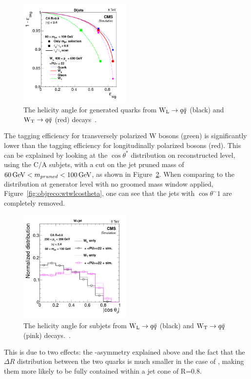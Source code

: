 \begin{figure}[h] 
    \centering 
    \includegraphics[width=0.5\textwidth]{figures/event_reconstruction/substructure_pas_roc3b.png}
     \caption{The helicity angle for generated quarks from $\mathrm{W}_{\mathrm{L}}\rightarrow q\bar{q}$ (black) and $\mathrm{W}_{\mathrm{T}}\rightarrow q\bar{q}$ (red) decays~\cite{Khachatryan:2014vla}.}
     \label{fig:objreco:wtwleff}
 \end{figure}

The tagging efficiency for transversely polarized W bosons (green) is significantly lower than the tagging efficiency for longitudinally polarized bosons (red). This can be explained by looking at the  $\cos \theta^*$ distribution on reconstructed level, using the C/A subjets, with a cut on the jet pruned mass of $60 \,\text{Ge\hspace{-.08em}V} < m_{pruned} < 100 \,\text{Ge\hspace{-.08em}V}$, as shown in Figure~\ref{fig:objreco:wtwlcostheta_reco}. When comparing to the distribution at generator level with no groomed mass window applied, Figure~\ref{fig:objreco:wtwlcostheta}, one can see that the \PWT jets with $\cos \theta^ \sim 1$ are completely removed.
\begin{figure}[h] 
    \centering 
    \includegraphics[width=0.5\textwidth]{figures/event_reconstruction/s1vs2-600_sjCosTheta_afterMass.png}
     \caption{The helicity angle for subjets from $\mathrm{W}_{\mathrm{L}}\rightarrow q\bar{q}$ (black) and $\mathrm{W}_{\mathrm{T}}\rightarrow q\bar{q}$ (pink) decays.~\cite{Khachatryan:2014vla}.}
     \label{fig:objreco:wtwlcostheta_reco}
 \end{figure}
 This is due to two effects: the \PT-asymmetry explained above and the fact that the $\Delta R$ distribution between the two quarks is much smaller in the case of \PWL, making them more likely to be fully contained within a jet cone of R=0.8.

